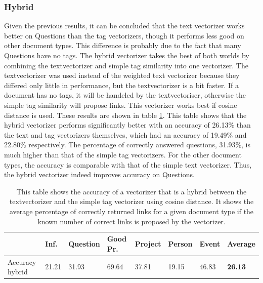 \subsubsection{Hybrid}
Given the previous results, it can be concluded that the text vectorizer works better on Questions than the tag vectorizers, though it performs less good on other document types. This difference is probably due to the fact that many Questions have no tags. The hybrid vectorizer takes the best of both worlds by combining the textvectorizer and simple tag similarity into one vectorizer. The textvectorizer was used instead of the weighted text vectorizer because they differed only little in performance, but the textvectorizer is a bit faster. If a document has no tags, it will be handeled by the textvectoriser, otherwise the simple tag similarity will propose links. This vectorizer works best if cosine distance is used. These results are shown in table \ref{hybrid}. This table shows that the hybrid vectorizer performs significantly better with an accuracy of 26.13\% than the text and tag vectorizers themselves, which had an accuracy of 19.49\% and 22.80\% respectively. The percentage of correctly answered questions, 31.93\%, is much higher than that of the simple tag vectorizers. For the other document types, the accuracy is comparable with that of the simple text vectorizer. Thus, the hybrid vectorizer indeed improves accuracy on Questions. 

\begin{table}[h!]
\begin{tabular}{| l | l | l | l | l | l | l | l |}
\hline
 & Inf. &  Question &  Good Pr.& Project & Person &  Event & {\bf Average} \\
\hline
Accuracy hybrid & 21.21 & 31.93 & 69.64 & 37.81 & 19.15 & 46.83 & {\bf 26.13}\\
\hline
\end{tabular}
\caption{This table shows the accuracy of a vectorizer that is a hybrid between the textvectorizer and the simple tag vectorizer using cosine distance. It shows the average percentage of correctly returned links for a given document type if the known number of correct links is proposed by the vectorizer.}
\label{hybrid}
\end{table}

